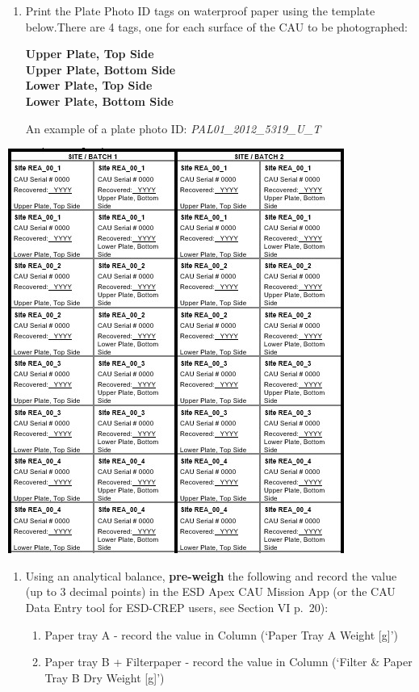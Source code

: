 \documentclass[
]{book}
\providecommand{\tightlist}{%
  \setlength{\itemsep}{0pt}\setlength{\parskip}{0pt}}
\begin{document}
\begin{enumerate}
\def\labelenumi{\arabic{enumi}.}
\setcounter{enumi}{4}
\item
  Print the Plate Photo ID tags on waterproof paper using the template below.There are 4 tags, one for each surface of the CAU to be photographed:

  \textbf{Upper Plate, Top Side}\\
  \textbf{Upper Plate, Bottom Side}\\
  \textbf{Lower Plate, Top Side}\\
  \textbf{Lower Plate, Bottom Side}

  An example of a plate photo ID: \emph{PAL01\_2012\_5319\_U\_T}
\end{enumerate}

\includegraphics{images/Template2.jpg}

\begin{enumerate}
\def\labelenumi{\arabic{enumi}.}
\setcounter{enumi}{5}
\item
  Using an analytical balance, \textbf{pre-weigh} the following and record the value (up to 3 decimal points) in the ESD Apex CAU Mission App (or the CAU Data Entry tool for ESD-CREP users, see Section VI p.~20):

  \begin{enumerate}
  \def\labelenumii{\alph{enumii}.}
  \tightlist
  \item
    Paper tray A - record the value in Column (`Paper Tray A Weight {[}g{]}')\\
  \item
    Paper tray B + Filterpaper - record the value in Column (`Filter \& Paper Tray B Dry Weight {[}g{]}')
  \end{enumerate}
\end{enumerate}
\end{document}
